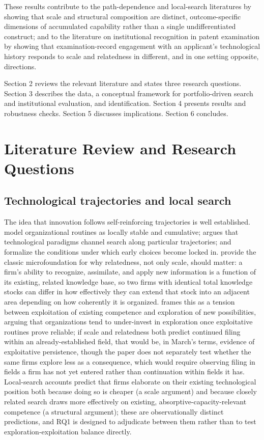 \documentclass[12pt]{article}
\begin{document}
These results contribute to the path-dependence and local-search literatures by showing that scale and structural composition are distinct, outcome-specific dimensions of accumulated capability rather than a single undifferentiated construct; and to the literature on institutional recognition in patent examination by showing that examination-record engagement with an applicant's technological history responds to scale and relatedness in different, and in one setting opposite, directions.

Section 2 reviews the relevant literature and states three research questions. Section 3 describes the data, a conceptual framework for portfolio-driven search and institutional evaluation, and identification. Section 4 presents results and robustness checks. Section 5 discusses implications. Section 6 concludes.

\section{Literature Review and Research Questions}

\subsection{Technological trajectories and local search}

The idea that innovation follows self-reinforcing trajectories is well established. \citet{nelson1982} model organizational routines as locally stable and cumulative; \citet{dosi1982} argues that technological paradigms channel search along particular trajectories; \citet{david1985} and \citet{sydow2009} formalize the conditions under which early choices become locked in. \citet{cohenlevinthal1990} provide the classic microfoundation for why relatedness, not only scale, should matter: a firm's ability to recognize, assimilate, and apply new information is a function of its existing, related knowledge base, so two firms with identical total knowledge stocks can differ in how effectively they can extend that stock into an adjacent area depending on how coherently it is organized. \citet{march1991} frames this as a tension between exploitation of existing competence and exploration of new possibilities, arguing that organizations tend to under-invest in exploration once exploitative routines prove reliable; if scale and relatedness both predict continued filing within an already-established field, that would be, in March's terms, evidence of exploitative persistence, though the paper does not separately test whether the same firms explore less as a consequence, which would require observing filing in fields a firm has not yet entered rather than continuation within fields it has. Local-search accounts predict that firms elaborate on their existing technological position both because doing so is cheaper (a scale argument) and because closely related search draws more effectively on existing, absorptive-capacity-relevant competence (a structural argument); these are observationally distinct predictions, and RQ1 is designed to adjudicate between them rather than to test exploration-exploitation balance directly.
\end{document}
